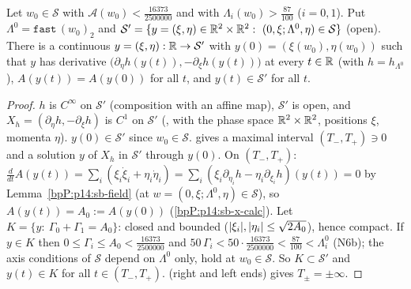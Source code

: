 \begin{lemma}\label{bpP:p14:sb-slow}
Let $w_0\in\mathcal S$ with $\mathcal A(w_0)<\frac{16373}{2500000}$ and with $\Lambda_i(w_0)>\frac{87}{100}$ ($i=0,1$). Put $\Lambda^0=\texttt{fast}\,(w_0)_2$ and $\mathcal S'=\{y=(\xi,\eta)\in\mathbb{R}^2\times\mathbb{R}^2:\ (0,\xi;\Lambda^0,\eta)\in\mathcal S\}$ (open). There is a continuous $y=(\xi,\eta):\mathbb{R}\to\mathcal S'$ with $y(0)=(\xi(w_0),\eta(w_0))$ such that $y$ has derivative $\bigl(\partial_\eta h(y(t)),-\partial_\xi h(y(t))\bigr)$ at every $t\in\mathbb{R}$ (with $h=h_{\Lambda^0}$), $A(y(t))=A(y(0))$ for all $t$, and $y(t)\in\mathcal S'$ for all $t$.
\end{lemma}
\begin{proof}
\label{stepP:p14:sb-sl-1} $h$ is $C^\infty$ on $\mathcal S'$ (composition with an affine map), $\mathcal S'$ is open, and $X_h=(\partial_\eta h,-\partial_\xi h)$ is $C^1$ on $\mathcal S'$ (, with the phase space $\mathbb{R}^2\times\mathbb{R}^2$, positions $\xi$, momenta $\eta$). $y(0)\in\mathcal S'$ since $w_0\in\mathcal S$.
\label{stepP:p14:sb-sl-2}  gives a maximal interval $(T_-,T_+)\ni0$ and a solution $y$ of $X_h$ in $\mathcal S'$ through $y(0)$.
\label{stepP:p14:sb-sl-3} On $(T_-,T_+)$: $\frac d{dt}A(y(t))=\sum_i(\xi_i\dot\xi_i+\eta_i\dot\eta_i)=\sum_i(\xi_i\partial_{\eta_i}h-\eta_i\partial_{\xi_i}h)(y(t))=0$ by Lemma~\ref{bpP:p14:sb-field} (at $w=(0,\xi;\Lambda^0,\eta)\in\mathcal S$), so $A(y(t))=A_0:=A(y(0))$ (\ref{bpP:p14:sb-x-calc}).
\label{stepP:p14:sb-sl-4} Let $K=\{y:\ \Gamma_0+\Gamma_1=A_0\}$: closed and bounded ($\lvert \xi_i\rvert,\lvert \eta_i\rvert\le\sqrt{2A_0}$), hence compact. If $y\in K$ then $0\le\Gamma_i\le A_0<\frac{16373}{2500000}$ and $50\,\Gamma_i<50\cdot\frac{16373}{2500000}<\frac{87}{100}<\Lambda^0_i$ (N6b); the axis conditions of $\mathcal S$ depend on $\Lambda^0$ only, hold at $w_0\in\mathcal S$. So $K\subset\mathcal S'$ and $y(t)\in K$ for all $t\in(T_-,T_+)$.
\label{stepP:p14:sb-sl-5}  (right and left ends) gives $T_\pm=\pm\infty$.
\end{proof}

